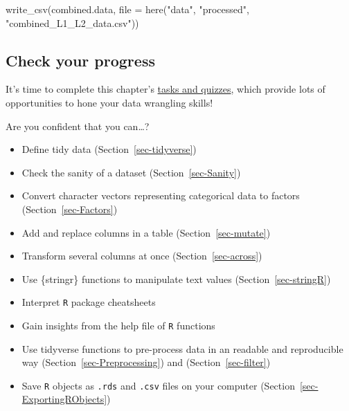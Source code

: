 \documentclass[
  letterpaper,
  DIV=11,
  numbers=noendperiod]{scrreprt}
\newenvironment{Shaded}{\begin{snugshade}}{\end{snugshade}}
\newcommand{\AttributeTok}[1]{\textcolor[rgb]{0.40,0.45,0.13}{#1}}
\newcommand{\FunctionTok}[1]{\textcolor[rgb]{0.28,0.35,0.67}{#1}}
\newcommand{\NormalTok}[1]{\textcolor[rgb]{0.00,0.23,0.31}{#1}}
\newcommand{\StringTok}[1]{\textcolor[rgb]{0.13,0.47,0.30}{#1}}
\providecommand{\tightlist}{%
  \setlength{\itemsep}{0pt}\setlength{\parskip}{0pt}}
\begin{document}
\begin{Shaded}
\begin{Highlighting}[]
\FunctionTok{write\_csv}\NormalTok{(combined.data, }\AttributeTok{file =} \FunctionTok{here}\NormalTok{(}\StringTok{"data"}\NormalTok{, }\StringTok{"processed"}\NormalTok{, }\StringTok{"combined\_L1\_L2\_data.csv"}\NormalTok{))}
\end{Highlighting}
\end{Shaded}

\subsection*{Check your progress}\label{check-your-progress-17}

It's time to complete this chapter's
\href{https://elenlefoll.github.io/RstatsTextbook/quizzes/9_quiz.html}{tasks
and quizzes}, which provide lots of opportunities to hone your data
wrangling skills! 

Are you confident that you can\ldots?

\begin{itemize}
\tightlist
\item[$\square$]
  Define tidy data (Section~\ref{sec-tidyverse})
\item[$\square$]
  Check the sanity of a dataset (Section~\ref{sec-Sanity})
\item[$\square$]
  Convert character vectors representing categorical data to factors
  (Section~\ref{sec-Factors})
\item[$\square$]
  Add and replace columns in a table (Section~\ref{sec-mutate})
\item[$\square$]
  Transform several columns at once (Section~\ref{sec-across})
\item[$\square$]
  Use \{stringr\} functions to manipulate text values
  (Section~\ref{sec-stringR})
\item[$\square$]
  Interpret \texttt{R} package cheatsheets
\item[$\square$]
  Gain insights from the help file of \texttt{R} functions
\item[$\square$]
  Use tidyverse functions to pre-process data in an readable and
  reproducible way (Section~\ref{sec-Preprocessing}) and
  (Section~\ref{sec-filter})
\item[$\square$]
  Save \texttt{R} objects as \texttt{.rds} and \texttt{.csv} files on
  your computer (Section~\ref{sec-ExportingRObjects})
\end{itemize}
\end{document}
